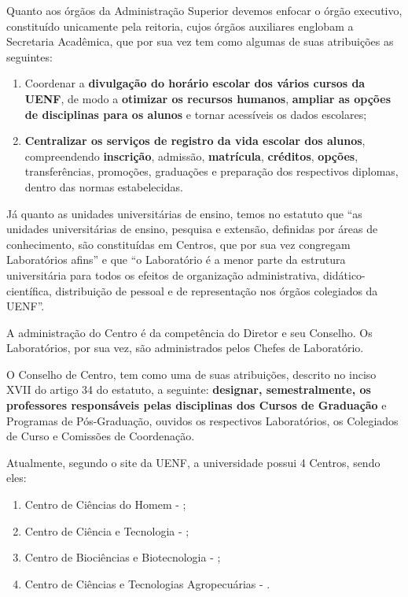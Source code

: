 Quanto aos órgãos da Administração Superior devemos enfocar o órgão executivo, constituído unicamente pela reitoria, cujos órgãos auxiliares englobam a Secretaria Acadêmica, que por sua vez tem como algumas de suas atribuições as seguintes:

\begin{enumerate}
  \item Coordenar a \textbf{divulgação do horário escolar dos vários cursos da UENF}, de modo a \textbf{otimizar os recursos humanos}, \textbf{ampliar as opções de disciplinas para os alunos} e tornar acessíveis os dados escolares;
  \item \textbf{Centralizar os serviços de registro da vida escolar dos alunos}, compreendendo \textbf{inscrição}, admissão, \textbf{matrícula}, \textbf{créditos}, \textbf{opções}, transferências, promoções, graduações e preparação dos respectivos diplomas, dentro das normas estabelecidas.
\end{enumerate}

Já quanto as unidades universitárias de ensino, temos no estatuto que ``as unidades universitárias de ensino, pesquisa e extensão, definidas por áreas de conhecimento, são constituídas em Centros, que por sua vez congregam Laboratórios afins'' e que ``o Laboratório é a menor parte da estrutura universitária para todos os efeitos de organização administrativa, didático-científica, distribuição de pessoal e de representação nos órgãos colegiados da UENF''.

A administração do Centro é da competência do Diretor e seu Conselho. Os Laboratórios, por sua vez, são administrados pelos Chefes de Laboratório.

O Conselho de Centro, tem como uma de suas atribuições, descrito no inciso XVII do artigo 34 do estatuto, a seguinte: \textbf{designar, semestralmente, os professores responsáveis pelas disciplinas dos Cursos de Graduação} e Programas de Pós-Graduação, ouvidos os respectivos Laboratórios, os Colegiados de Curso e Comissões de Coordenação.

Atualmente, segundo o site da UENF, a universidade possui 4 Centros, sendo eles:

\begin{enumerate}
  \item Centro de Ciências do Homem - ;
  \item Centro de Ciência e Tecnologia - ;
  \item Centro de Biociências e Biotecnologia - ;
  \item Centro de Ciências e Tecnologias Agropecuárias - .
\end{enumerate}

